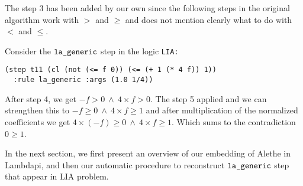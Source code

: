 The step 3 has been added by our own since the following steps in the original algorithm work with $>$ and $\geq$ and does not
mention clearly what to do with $<$ and $\leq$.

\begin{example}
Consider the $\tt{la\_generic}$ step in the logic \tt{LIA}:
\begin{lstlisting}[language=SMT,label={lst:smtexampleinput}]
(step t11 (cl (not (<= f 0)) (<= (+ 1 (* 4 f)) 1))
  :rule la_generic :args (1.0 1/4))
\end{lstlisting}
After step 4, we get $- f > 0 ~\land~ 4 \times f > 0$. The step 5 applied and we can strengthen this to
$- f \geq 0 ~\land~ 4 \times f \geq 1$ and after multiplication of the normalized coefficients we get $4 \times(- f) \geq 0 ~\land~ 4 \times f \geq 1$.
Which sums to the contradiction  $0 \geq 1$. 
\end{example}

In the next section, we first present an overview of our embedding of Alethe in Lambdapi, and then our automatic procedure to reconstruct $\tt{la\_generic}$ step that appear in LIA problem.
